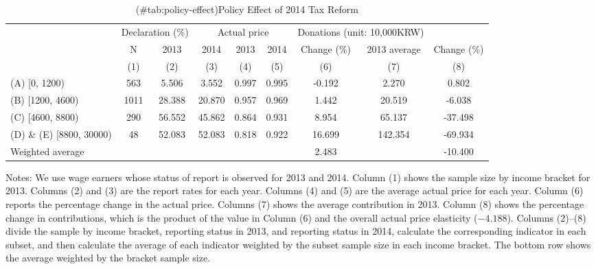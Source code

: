 \begin{table}

\caption{(\#tab:policy-effect)Policy Effect of 2014 Tax Reform}
\centering
\fontsize{8}{10}\selectfont
\begin{threeparttable}
\begin{tabular}[t]{>{\raggedright\arraybackslash}p{10em}cccccccc}
\toprule
\multicolumn{2}{c}{ } & \multicolumn{2}{c}{Declaration (\%)} & \multicolumn{3}{c}{Actual price} & \multicolumn{2}{c}{Donations (unit: 10,000KRW)} \\
\cmidrule(l{3pt}r{3pt}){3-4} \cmidrule(l{3pt}r{3pt}){5-7} \cmidrule(l{3pt}r{3pt}){8-9}
\multicolumn{1}{c}{2013 Income bracket} & \multicolumn{1}{c}{N} & \multicolumn{1}{c}{2013} & \multicolumn{1}{c}{2014} & \multicolumn{1}{c}{2013} & \multicolumn{1}{c}{2014} & \multicolumn{1}{c}{Change (\%)} & \multicolumn{1}{c}{2013 average} & \multicolumn{1}{c}{Change (\%)} \\
\cmidrule(l{3pt}r{3pt}){1-1} \cmidrule(l{3pt}r{3pt}){2-2} \cmidrule(l{3pt}r{3pt}){3-3} \cmidrule(l{3pt}r{3pt}){4-4} \cmidrule(l{3pt}r{3pt}){5-5} \cmidrule(l{3pt}r{3pt}){6-6} \cmidrule(l{3pt}r{3pt}){7-7} \cmidrule(l{3pt}r{3pt}){8-8} \cmidrule(l{3pt}r{3pt}){9-9}
 & (1) & (2) & (3) & (4) & (5) & (6) & (7) & (8)\\
\midrule
(A) [0, 1200) & 563 & 5.506 & 3.552 & 0.997 & 0.995 & -0.192 & 2.270 & 0.802\\
(B) [1200, 4600) & 1011 & 28.388 & 20.870 & 0.957 & 0.969 & 1.442 & 20.519 & -6.038\\
(C) [4600, 8800) & 290 & 56.552 & 45.862 & 0.864 & 0.931 & 8.954 & 65.137 & -37.498\\
(D) \& (E) [8800, 30000) & 48 & 52.083 & 52.083 & 0.818 & 0.922 & 16.699 & 142.354 & -69.934\\
Weighted average &  &  &  &  &  & 2.483 &  & -10.400\\
\bottomrule
\end{tabular}
\begin{tablenotes}
\item Notes: We use wage earners whose status of report is observed for 2013 and 2014. Column (1) shows the sample size by income bracket for 2013. Columns (2) and (3) are the report rates for each year. Columns (4) and (5) are the average actual price for each year. Column (6) reports the percentage change in the actual price. Columns (7) shows the average contribution in 2013. Column (8) shows the percentage change in contributions, which is the product of the value in Column (6) and the overall actual price elasticity ($-4.188$). Columns (2)--(8) divide the sample by income bracket, reporting status in 2013, and reporting status in 2014, calculate the corresponding indicator in each subset, and then calculate the average of each indicator weighted by the subset sample size in each income bracket. The bottom row shows the average weighted by the bracket sample size.
\end{tablenotes}
\end{threeparttable}
\end{table}

